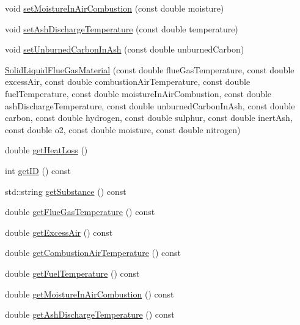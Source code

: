 \begin{DoxyCompactItemize}
\item 
void \hyperlink{class_solid_liquid_flue_gas_material_a1a5f1bd3008e78cce62edb8aca642284}{set\+Moisture\+In\+Air\+Combustion} (const double moisture)
\item 
void \hyperlink{class_solid_liquid_flue_gas_material_ad29543a88737c3d051c7d824287bc791}{set\+Ash\+Discharge\+Temperature} (const double temperature)
\item 
void \hyperlink{class_solid_liquid_flue_gas_material_adf052dd1bdceeab710a4986b1fd874b9}{set\+Unburned\+Carbon\+In\+Ash} (const double unburned\+Carbon)
\item 
\hyperlink{class_solid_liquid_flue_gas_material_a91e7c5e670b3db4fedcbc494448644d5}{Solid\+Liquid\+Flue\+Gas\+Material} (const double flue\+Gas\+Temperature, const double excess\+Air, const double combustion\+Air\+Temperature, const double fuel\+Temperature, const double moisture\+In\+Air\+Combustion, const double ash\+Discharge\+Temperature, const double unburned\+Carbon\+In\+Ash, const double carbon, const double hydrogen, const double sulphur, const double inert\+Ash, const double o2, const double moisture, const double nitrogen)
\item 
double \hyperlink{class_solid_liquid_flue_gas_material_af7d36673e49f9b5eb631fc04227883d6}{get\+Heat\+Loss} ()
\item 
int \hyperlink{class_solid_liquid_flue_gas_material_afb124b546137da7ba99e31616198e0c8}{get\+ID} () const
\item 
std\+::string \hyperlink{class_solid_liquid_flue_gas_material_a6e07a23fb05c15c7e5dba39334988de8}{get\+Substance} () const
\item 
double \hyperlink{class_solid_liquid_flue_gas_material_aba4604158b3c624496d7de4b5fb511e2}{get\+Flue\+Gas\+Temperature} () const
\item 
double \hyperlink{class_solid_liquid_flue_gas_material_a49e7bb4ebc45897c81b6f38610ceaf02}{get\+Excess\+Air} () const
\item 
double \hyperlink{class_solid_liquid_flue_gas_material_a8757b831e5a2ef26dbb0cf271c0e8207}{get\+Combustion\+Air\+Temperature} () const
\item 
double \hyperlink{class_solid_liquid_flue_gas_material_a629ecc7104b6bfbb696d9478c4b48e7a}{get\+Fuel\+Temperature} () const
\item 
double \hyperlink{class_solid_liquid_flue_gas_material_ae3d9780851b8217ed2885753f11ec18b}{get\+Moisture\+In\+Air\+Combustion} () const
\item 
double \hyperlink{class_solid_liquid_flue_gas_material_ab233d4e27397cc74fbe2d3084e4e6f7c}{get\+Ash\+Discharge\+Temperature} () const

\end{DoxyCompactItemize}
